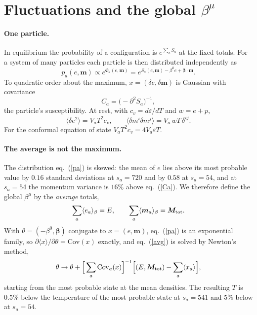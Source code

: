 \documentclass[11pt,aps,preprint,nofootinbib,superscriptaddress,tightenlines]{revtex4-2}
\def\st{\begin{equation}}
\def\stp{\end{equation}}
\def\Eq#1{eq.~(\ref{#1})}
\newcommand{\avg}[1]{\langle #1\rangle}
\let\oldparagraph\paragraph
\renewcommand{\paragraph}{\par\bigskip\oldparagraph}
\begin{document}
\section{Fluctuations and the global $\beta^\mu$}
\label{sec:fluct}

\paragraph{One particle.}  In equilibrium the probability of a configuration is
$e^{\sum_aS_a}$ at the fixed totals.  For a system of many particles each particle is
then distributed independently as
\st
p_a(e,\bm m)\propto e^{\Phi_a(e,\bm m)}=e^{S_a(e,\bm m)-\beta^0e+\bm\beta\cdot\bm m} .
\label{pa}
\stp
To quadratic order about the maximum, $x=(\delta e,\delta\bm m)$ is Gaussian with covariance
\st
C_a=\big(-\partial^2S_a\big)^{-1},
\label{Ca}
\stp
the particle's susceptibility.  At rest, with $c_v=d\varepsilon/dT$ and $w=e+p$,
\st
\avg{\delta e^2}=V_aT^2c_v,\qquad \avg{\delta m^i\delta m^j}=V_a\,wT\,\delta^{ij} .
\stp
For the conformal equation of state $V_aT^2c_v=4V_a\varepsilon T$.

\paragraph{The average is not the maximum.}  The distribution \Eq{pa} is skewed: the mean
of $e$ lies above its most probable value by $0.16$ standard deviations at $s_a=720$
and by $0.58$ at $s_a=54$, and at $s_a=54$ the momentum variance is $16\%$ above
\Eq{Ca}.  We therefore define the global $\beta^\mu$ by the \emph{average} totals,
\st
\sum_a\avg{e_a}_\beta=E,\qquad \sum_a\avg{\bm m_a}_\beta=\bm M_{\rm tot} .
\label{avg}
\stp
With $\theta=(-\beta^0,\bm\beta)$ conjugate to $x=(e,\bm m)$, \Eq{pa} is an exponential family,
so $\partial\avg{x}/\partial\theta=\mathrm{Cov}(x)$ exactly, and \Eq{avg} is solved by Newton's
method,
\st
\theta\to\theta+\Big[\sum_a\mathrm{Cov}_a(x)\Big]^{-1}\Big[(E,\bm M_{\rm tot})-\sum_a\avg{x_a}\Big],
\stp
starting from the most probable state at the mean densities.  The resulting $T$ is
$0.5\%$ below the temperature of the most probable state at $s_a=541$ and $5\%$ below at
$s_a=54$.
\end{document}
